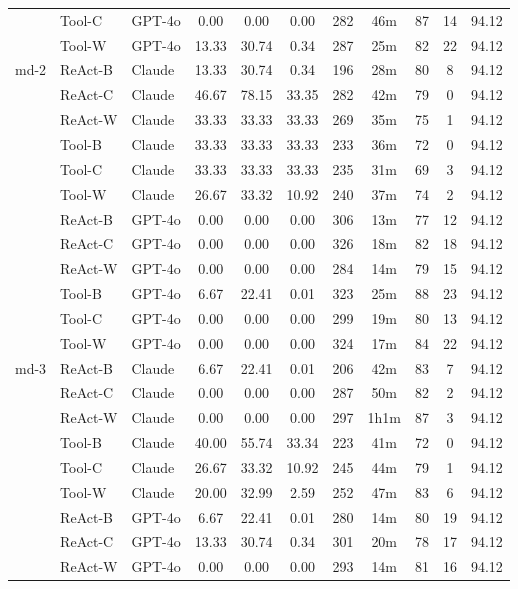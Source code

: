 \begin{longtable}{lllcccccccc}
 & Tool-C & GPT-4o & 0.00 & 0.00 & 0.00 & 282 & 46m & 87 & 14 & 94.12 \\
 & Tool-W & GPT-4o & 13.33 & 30.74 & 0.34 & 287 & 25m & 82 & 22 & 94.12 \\
md-2 & ReAct-B & Claude & 13.33 & 30.74 & 0.34 & 196 & 28m & 80 & 8 & 94.12 \\
 & ReAct-C & Claude & 46.67 & 78.15 & 33.35 & 282 & 42m & 79 & 0 & 94.12 \\
 & ReAct-W & Claude & 33.33 & 33.33 & 33.33 & 269 & 35m & 75 & 1 & 94.12 \\
 & Tool-B & Claude & 33.33 & 33.33 & 33.33 & 233 & 36m & 72 & 0 & 94.12 \\
 & Tool-C & Claude & 33.33 & 33.33 & 33.33 & 235 & 31m & 69 & 3 & 94.12 \\
 & Tool-W & Claude & 26.67 & 33.32 & 10.92 & 240 & 37m & 74 & 2 & 94.12 \\
 & ReAct-B & GPT-4o & 0.00 & 0.00 & 0.00 & 306 & 13m & 77 & 12 & 94.12 \\
 & ReAct-C & GPT-4o & 0.00 & 0.00 & 0.00 & 326 & 18m & 82 & 18 & 94.12 \\
 & ReAct-W & GPT-4o & 0.00 & 0.00 & 0.00 & 284 & 14m & 79 & 15 & 94.12 \\
 & Tool-B & GPT-4o & 6.67 & 22.41 & 0.01 & 323 & 25m & 88 & 23 & 94.12 \\
 & Tool-C & GPT-4o & 0.00 & 0.00 & 0.00 & 299 & 19m & 80 & 13 & 94.12 \\
 & Tool-W & GPT-4o & 0.00 & 0.00 & 0.00 & 324 & 17m & 84 & 22 & 94.12 \\
md-3 & ReAct-B & Claude & 6.67 & 22.41 & 0.01 & 206 & 42m & 83 & 7 & 94.12 \\
 & ReAct-C & Claude & 0.00 & 0.00 & 0.00 & 287 & 50m & 82 & 2 & 94.12 \\
 & ReAct-W & Claude & 0.00 & 0.00 & 0.00 & 297 & 1h1m & 87 & 3 & 94.12 \\
 & Tool-B & Claude & 40.00 & 55.74 & 33.34 & 223 & 41m & 72 & 0 & 94.12 \\
 & Tool-C & Claude & 26.67 & 33.32 & 10.92 & 245 & 44m & 79 & 1 & 94.12 \\
 & Tool-W & Claude & 20.00 & 32.99 & 2.59 & 252 & 47m & 83 & 6 & 94.12 \\
 & ReAct-B & GPT-4o & 6.67 & 22.41 & 0.01 & 280 & 14m & 80 & 19 & 94.12 \\
 & ReAct-C & GPT-4o & 13.33 & 30.74 & 0.34 & 301 & 20m & 78 & 17 & 94.12 \\
 & ReAct-W & GPT-4o & 0.00 & 0.00 & 0.00 & 293 & 14m & 81 & 16 & 94.12 \\

\end{longtable}
